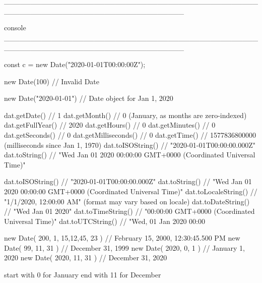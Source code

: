 __________________________________________________________________________________

console 
__________________________________________________________________________________

const c = new Date("2020-01-01T00:00:00Z");

new Date(100) // Invalid Date

new Date("2020-01-01") // Date object for Jan 1, 2020



dat.getDate() // 1
dat.getMonth() // 0 (January, as months are zero-indexed)
dat.getFullYear() // 2020
dat.getHours() // 0
dat.getMinutes() // 0
dat.getSeconds() // 0
dat.getMilliseconds() // 0
dat.getTime() // 1577836800000 (milliseconds since Jan 1, 1970)
dat.toISOString() // "2020-01-01T00:00:00.000Z"
dat.toString() // "Wed Jan 01 2020 00:00:00 GMT+0000 (Coordinated Universal Time)"  



dat.toISOString() // "2020-01-01T00:00:00.000Z"
dat.toString() // "Wed Jan 01 2020 00:00:00 GMT+0000 (Coordinated Universal Time)"
dat.toLocaleString() // "1/1/2020, 12:00:00 AM" (format may vary based on locale)
dat.toDateString() // "Wed Jan 01 2020"
dat.toTimeString() // "00:00:00 GMT+0000 (Coordinated Universal Time)"
dat.toUTCString() // "Wed, 01 Jan 2020 00:00




new Date( 200, 1, 15,12,45, 23 ) // February 15, 2000, 12:30:45.500 PM
new Date( 99, 11, 31 ) // December 31, 1999
new Date( 2020, 0, 1 ) // January 1, 2020
new Date( 2020, 11, 31 ) // December    31, 2020


start with 0 for January
end with 11 for December        